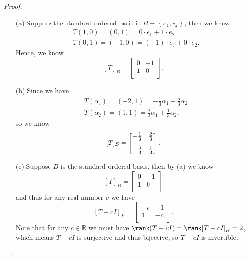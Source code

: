 \begin{proof}
    \vphantom{text}
    \begin{itemize}
        \item [(a)] Suppose the standard ordered basis is \(B = \left\{ e_1, e_2 \right\} \), then we know 
        \begin{align*}
            &T(1, 0) = (0, 1) = 0 \cdot e_1 + 1 \cdot e_2 \\
            &T(0, 1) = (-1, 0) = (-1) \cdot e_1 + 0 \cdot e_2.
        \end{align*}
        Hence, we know 
        \[
            [T]_B = \begin{bmatrix}
                0 & -1  \\
                1 & 0  \\
            \end{bmatrix}.
        \]
        \item [(b)] Since we have 
        \begin{align*}
            &T(\alpha _1) = (-2, 1) = -\frac{1}{3}\alpha _1 - \frac{5}{3}\alpha _2 \\
            &T(\alpha _2) = (1, 1) = \frac{2}{3}\alpha _1 + \frac{1}{3}\alpha _2,
        \end{align*}
        so we know 
        \[
            [T]_{\mathcal{B} } = \begin{bmatrix}
                -\frac{1}{3} & \frac{2}{3}  \vspace{0.8em}\\
                -\frac{5}{3} & \frac{1}{3}  \\
            \end{bmatrix}.
        \]
        \item [(c)] Suppose \(B\) is the standard ordered basis, then by (a) we know 
        \[
            [T]_B = \begin{bmatrix}
                0 & -1  \\
                1 & 0  \\
            \end{bmatrix}
        \] and thus for any real number \(c\) we have 
        \[
            [T - cI]_B = \begin{bmatrix}
                -c & -1  \\
                1 & -c  \\
            \end{bmatrix}.
        \] Note that for any \(c \in \mathbb{R} \) we must have \(\rank (T - cI) = \rank [T - cI]_B = 2\), which means \(T - cI\) is surjective and thus bijective, so \(T - cI\) is invertible.
        

\end{itemize}
\end{proof}
